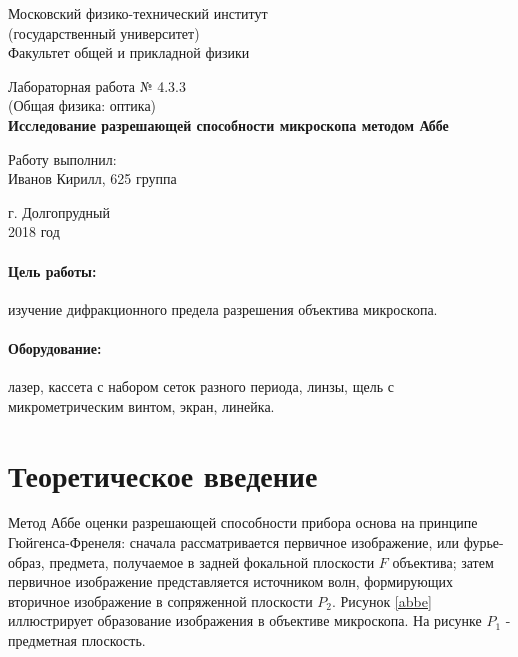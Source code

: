 \documentclass[12pt]{kiarticle}
\begin{document}
	
	\begin{titlepage}
		\begin{center}
			\large 	Московский физико-технический институт \\
			(государственный университет) \\
			Факультет общей и прикладной физики \\
			\vspace{0.2cm}
			
			\vspace{4.5cm}
			Лабораторная работа № 4.3.3 \\ \vspace{0.2cm}
			\large (Общая физика: оптика) \\ \vspace{0.2cm}
			\LARGE \textbf{Исследование разрешающей способности микроскопа методом Аббе}
		\end{center}
		\vspace{2.3cm} \large
		
		\begin{center}
			Работу выполнил: \\
			Иванов Кирилл,
			625 группа
			\vspace{10mm}		
			
		\end{center}
		
		\begin{center} \vspace{60mm}
			г. Долгопрудный \\
			2018 год
		\end{center}
	\end{titlepage}
	
	\paragraph*{Цель работы:} изучение дифракционного предела разрешения объектива микроскопа. 
	
	\paragraph*{Оборудование:} лазер, кассета с набором сеток разного периода, линзы, щель с микрометрическим винтом, экран, линейка. 
	
	\section{Теоретическое введение}
	
	Метод Аббе оценки разрешающей способности прибора основа на принципе Гюйгенса-Френеля: сначала рассматривается первичное изображение, или фурье-образ, предмета, получаемое в задней фокальной плоскости $F$ объектива; затем первичное изображение представляется источником волн, формирующих вторичное изображение в сопряженной плоскости $P_2$. Рисунок \ref{abbe} иллюстрирует образование изображения в объективе микроскопа. На рисунке $P_1$ - предметная плоскость. 
	
\end{document}
